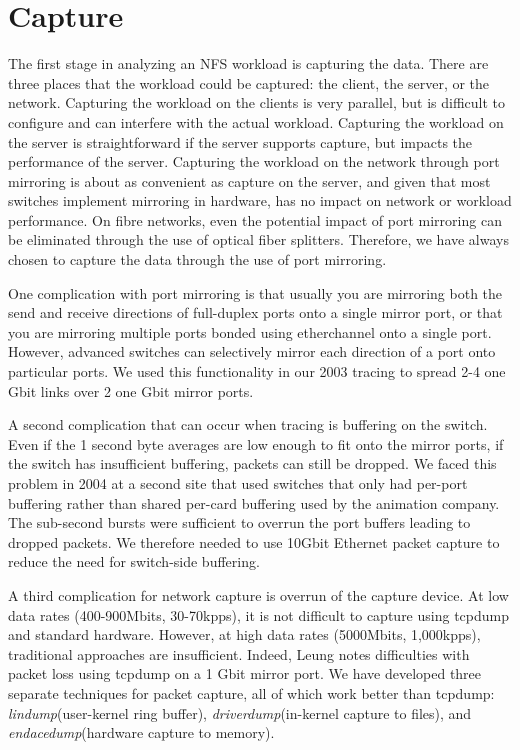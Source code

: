 \section{Capture}
\label{sec:capture}

The first stage in analyzing an NFS workload is capturing the data.
There are three places that the workload could be captured: the
client, the server, or the network.  Capturing the workload on the
clients is very parallel, but is difficult to configure and can
interfere with the actual workload.  Capturing the workload on the
server is straightforward if the server supports capture, 
but impacts the performance of the
server.  Capturing the workload on the network through port mirroring
is about as convenient as capture on the server, and given that most
switches implement mirroring in hardware, has no impact on network or
workload performance.  On fibre networks, even the potential impact of
port mirroring can be eliminated through the use of optical fiber
splitters. Therefore, we have always chosen to capture the
data through the use of port mirroring.

One complication with port mirroring is that usually you are mirroring
both the send and receive directions of full-duplex ports onto a
single mirror port, or that you are mirroring multiple ports bonded
using etherchannel onto a single port. However, advanced switches can
selectively mirror each direction of a port onto particular ports.  We
used this functionality in our 2003 tracing to spread 2-4 one Gbit
links over 2 one Gbit mirror ports.

A second complication that can occur when tracing is buffering on the
switch.  Even if the 1 second byte averages are low enough to fit onto
the mirror ports, if the switch has insufficient buffering, packets
can still be dropped.  We faced this problem in 2004 at a second
site that used switches that only had per-port buffering rather
than shared per-card buffering used by the animation company.  The
sub-second bursts were sufficient to overrun the port buffers leading
to dropped packets.  We therefore needed to use 10Gbit Ethernet packet
capture to reduce the need for switch-side buffering.

A third complication for network capture is overrun of the capture
device.  At low data rates (400-900Mbits, 30-70kpps), it is not
difficult to capture using tcpdump and standard hardware.  However, at
high data rates (5000Mbits, 1,000kpps), traditional approaches are
insufficient. Indeed, Leung\cite{LeungUsenix08} notes 
difficulties with packet loss using tcpdump on a 1 Gbit mirror port.
We have developed three separate techniques for packet capture, all of
which work better than tcpdump: {\it lindump}(user-kernel ring
buffer), {\it driverdump}(in-kernel capture to files), and {\it
endacedump}(hardware capture to memory).

